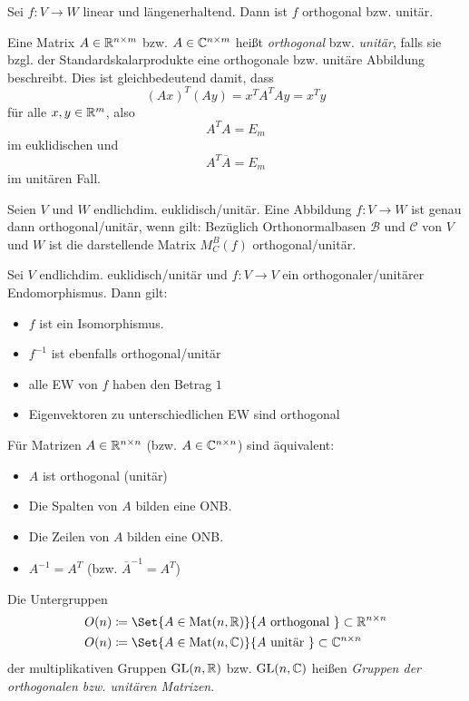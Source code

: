 \documentclass{cheat-sheet}
\newcommand{\GL}{\mathrm{GL}}
\newcommand{\Mat}{\mathrm{Mat}}
\newcommand{\BB}{\mathcal{B}}
\newcommand{\BC}{\mathcal{C}}
\begin{document}
\begin{satz}
Sei $f : V \to W$ linear und längenerhaltend. Dann ist $f$ orthogonal bzw. unitär.
\end{satz}

\begin{definition}
Eine Matrix $A \in \mathbb{R}^{n \times m}$ bzw. $A \in \mathbb{C}^{n \times m}$ heißt \emph{orthogonal} bzw. \emph{unitär}, falls sie bzgl. der Standardskalarprodukte eine orthogonale bzw. unitäre Abbildung beschreibt. Dies ist gleichbedeutend damit, dass
\[ (Ax)^T (Ay) = x^T A^T Ay = x^T y \]
für alle $x, y \in \mathbb{R}^m$, also
\[ A^T A = E_m \]
im euklidischen und
\[ A^T \overline{A} = E_m \]
im unitären Fall.
\end{definition}

\begin{satz}
Seien $V$ und $W$ endlichdim. euklidisch/unitär. Eine Abbildung $f : V \to W$ ist genau dann orthogonal/unitär, wenn gilt: Bezüglich Orthonormalbasen $\BB$ und $\BC$ von $V$ und $W$ ist die darstellende Matrix $M_C^B(f)$ orthogonal/unitär.
\end{satz}

\begin{satz}
Sei $V$ endlichdim. euklidisch/unitär und $f : V \to V$ ein orthogonaler/unitärer Endomorphismus. Dann gilt:
\begin{itemize}
  \item $f$ ist ein Isomorphismus.
  \item $f^{-1}$ ist ebenfalls orthogonal/unitär
  \item alle EW von $f$ haben den Betrag $1$
  \item Eigenvektoren zu unterschiedlichen EW sind orthogonal
\end{itemize}
\end{satz}

\begin{bem}
Für Matrizen $A \in \mathbb{R}^{n \times n}$ (bzw. $A \in \mathbb{C}^{n \times n}$) sind äquivalent:
\begin{itemize}
  \item $A$ ist orthogonal (unitär)
  \item Die Spalten von $A$ bilden eine ONB.
  \item Die Zeilen von $A$ bilden eine ONB.
  \item $A^{-1} = A^T$ (bzw. $\overline{A}^{-1} = A^T$)
\end{itemize}
\end{bem}

\begin{definition}
Die Untergruppen
\begin{align*}
O(n) &\coloneqq \Set{ A \in \Mat(n, \R) }{ A \text{ orthogonal } } \subset \R^{n \times n} \\
O(n) &\coloneqq \Set{ A \in \Mat(n, \C) }{ A \text{ unitär } } \subset \C^{n \times n} \\
\end{align*}
der multiplikativen Gruppen $\GL(n, \R)$ bzw. $\GL(n, \C)$ heißen \emph{Gruppen der orthogonalen bzw. unitären Matrizen}.
\end{definition}
\end{document}

